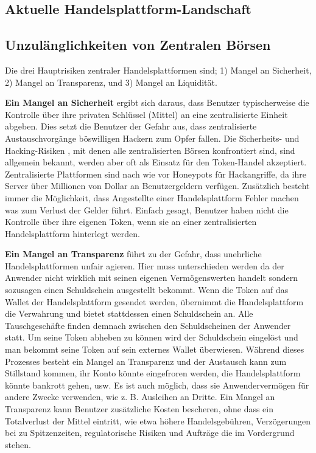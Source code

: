 \documentclass[UTF8,nofonts]{article}
\begin{document}
\begin{multicols}{2}
\section{Aktuelle Handelsplattform-Landschaft\label{sec:current_exchange_landscape}}

\subsection{Unzulänglichkeiten von Zentralen Börsen}
Die drei Hauptrisiken zentraler Handelsplattformen sind; 1) Mangel an Sicherheit, 2) Mangel an Transparenz, und 3) Mangel an Liquidität.

\textbf{Ein Mangel an Sicherheit} ergibt sich daraus, dass Benutzer typischerweise die Kontrolle über ihre privaten Schlüssel (Mittel) an eine zentralisierte Einheit abgeben. Dies setzt die Benutzer der Gefahr aus, dass zentralisierte Austauschvorgänge böswilligen Hackern zum Opfer fallen. Die Sicherheits- und Hacking-Risiken \cite{coincheckhack}  \cite{mcmillan2014inside}, mit denen alle zentralisierten Börsen konfrontiert sind, sind allgemein bekannt, werden aber oft als Einsatz für den Token-Handel akzeptiert. Zentralisierte Plattformen sind nach wie vor Honeypots für Hackangriffe, da ihre Server über Millionen von Dollar an Benutzergeldern verfügen. Zusätzlich besteht immer die Möglichkeit, dass Angestellte einer Handelsplattform Fehler machen was zum Verlust der Gelder führt. Einfach gesagt, Benutzer haben nicht die Kontrolle über ihre eigenen Token, wenn sie an einer zentralisierten Handelsplattform hinterlegt werden.

\textbf{Ein Mangel an Transparenz} führt zu der Gefahr, dass unehrliche Handelsplattformen unfair agieren. Hier muss unterschieden werden da der Anwender nicht wirklich mit seinen eigenen Vermögenswerten handelt sondern sozusagen einen Schuldschein ausgestellt bekommt. Wenn die Token auf das Wallet der Handelsplattform gesendet werden, übernimmt die Handelsplattform die Verwahrung und bietet stattdessen einen Schuldschein an. Alle Tauschgeschäfte finden demnach zwischen den Schuldscheinen der Anwender statt. Um seine Token abheben zu können wird der Schuldschein eingelöst und man bekommt seine Token auf sein externes Wallet überwiesen. Während dieses Prozesses besteht ein Mangel an Transparenz und der Austausch kann zum Stillstand kommen, ihr Konto könnte eingefroren werden, die Handelsplattform könnte bankrott gehen, usw. Es ist auch möglich, dass sie Anwendervermögen für andere Zwecke verwenden, wie z. B. Ausleihen an Dritte. Ein Mangel an Transparenz kann Benutzer zusätzliche Kosten bescheren, ohne dass ein Totalverlust der Mittel eintritt, wie etwa höhere Handelsgebühren, Verzögerungen bei zu Spitzenzeiten, regulatorische Risiken und Aufträge die im Vordergrund stehen.


\end{multicols}
\end{document}
